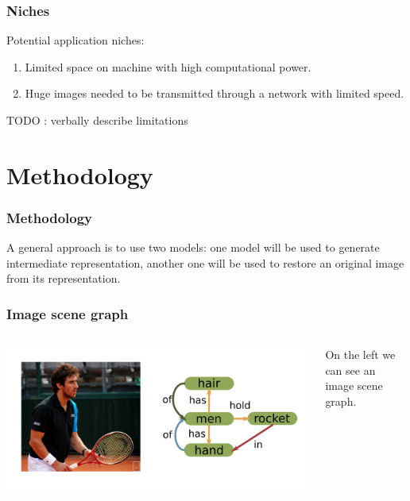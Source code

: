 \documentclass[10pt]{beamer}
\begin{document}
\begin{frame}
    \frametitle{Niches}

    Potential application niches:

    \begin{enumerate}
        \item Limited space on machine with high computational power.
        \item Huge images needed to be transmitted through a network with limited speed.
    \end{enumerate}

    TODO : verbally describe limitations
\end{frame}

\section{Methodology}
\begin{frame}
    \frametitle{Methodology}

    A general approach is to use two models: one model will be used to generate intermediate representation, another one will be used to restore an original image from its representation.

\end{frame}

\begin{frame}
    \frametitle{Image scene graph}

    \begin{columns}
        \begin{column}{0.5\textwidth}
            \includegraphics[width=\textwidth]{figure/image-and-scene-graph.png}
        \end{column}

        \begin{column}{0.5\textwidth}
            On the left we can see an image scene graph.
        \end{column}
    \end{columns}
\end{frame}
\end{document}
